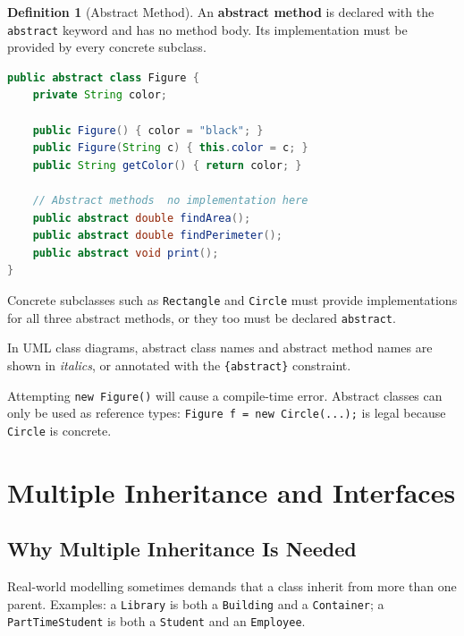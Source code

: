\documentclass[11pt, a4paper, notitlepage]{report}
\theoremstyle{definition}
\newtheorem{definition}[theorem]{Definition}
\theoremstyle{remark}
\theoremstyle{definition}
\begin{document}
\begin{definition}[Abstract Method]
\label{def:ch3-abstract-method}
An \textbf{abstract method} is declared with the \texttt{abstract} keyword and has no method body. Its implementation must be provided by every concrete subclass.
\end{definition}

\begin{lstlisting}[language=Java]
public abstract class Figure {
    private String color;

    public Figure() { color = "black"; }
    public Figure(String c) { this.color = c; }
    public String getColor() { return color; }

    // Abstract methods  no implementation here
    public abstract double findArea();
    public abstract double findPerimeter();
    public abstract void print();
}
\end{lstlisting}

Concrete subclasses such as \texttt{Rectangle} and \texttt{Circle} must provide implementations for all three abstract methods, or they too must be declared \texttt{abstract}.

In UML class diagrams, abstract class names and abstract method names are shown in \textit{italics}, or annotated with the \texttt{\{abstract\}} constraint.

\begin{warning}[title={Warning: Cannot Instantiate Abstract Classes}]
Attempting \texttt{new Figure()} will cause a compile-time error. Abstract classes can only be used as reference types: \texttt{Figure f = new Circle(...);} is legal because \texttt{Circle} is concrete.
\end{warning}

%
\section{Multiple Inheritance and Interfaces}
\label{sec:ch3-interfaces}

\subsection{Why Multiple Inheritance Is Needed}
\label{sec:ch3-multiple-inheritance}

Real-world modelling sometimes demands that a class inherit from more than one parent. Examples: a \texttt{Library} is both a \texttt{Building} and a \texttt{Container}; a \texttt{PartTimeStudent} is both a \texttt{Student} and an \texttt{Employee}.
\end{document}
